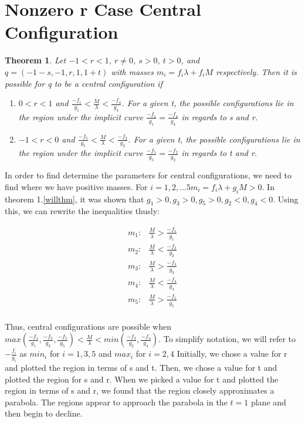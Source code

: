 \documentclass[11pt,leqno]{article}
\newtheorem{theorem}{Theorem}[section]
\theoremstyle{definition}
\theoremstyle{remark}
\numberwithin{equation}{section}
\begin{document}
\section{Nonzero r Case Central Configuration}

\begin{theorem}
\label{thmsc}
\emph{Let $-1<r<1$, $r\neq0$, $s>0$, $t>0$, and $q=(-1-s,-1,r,1,1+t)$
with masses $m_{i}=f_{i}\lambda+f_{i}M$ respectively. Then it is possible for q to be a
central configuration if }
\begin{enumerate}
\item \emph{$0<r<1$ and $\frac{-f_{1}}{g_{1}}<\frac{M}{\lambda}<\frac{-f_{4}}{g_{4}}$.
For a given t, the possible configurations lie in the region under
the implicit curve $\frac{-f_{1}}{g_{1}}=\frac{-f_{4}}{g_{4}}$ in
regards to s and r.}
\item \emph{$-1<r<0$ and $\frac{-f_{5}}{g_{5}}<\frac{M}{\lambda}<\frac{-f_{2}}{g_{2}}$.
For a given t, the possible configurations lie in the region under
the implicit curve $\frac{-f_{5}}{g_{5}}=\frac{-f_{2}}{g_{2}}$ in
regards to t and r.}\end{enumerate}
\end{theorem}

In order to find determine the parameters for central configurations, we need to find where we have positive masses. For $i={1,2,...5} m_i = f_i\lambda + g_iM > 0$. In theorem 1.\ref{willthm}, it was shown that $g_1 > 0, g_3 > 0, g_5 > 0, g_2 < 0, g_4 < 0$. Using this, we can rewrite the inequalities thusly: 

\begin{equation} \begin{array}{ll}
m_1: & \frac{M}{\lambda} > \frac{-f_1}{g_1} \\
m_2: & \frac{M}{\lambda} < \frac{-f_2}{g_2} \\
m_3: & \frac{M}{\lambda} > \frac{-f_3}{g_3} \\
m_4: & \frac{M}{\lambda} < \frac{-f_4}{g_4} \\
m_5: & \frac{M}{\lambda} > \frac{-f_5}{g_5} \\
\end{array}
\end{equation}

Thus, central configurations are possible when $max(\frac{-f_1}{g_1},\frac{-f_3}{g_3},\frac{-f_5}{g_5})<\frac{M}{\lambda}<min(\frac{-f_2}{g_2},\frac{-f_4}{g_4})$. To simplify notation, we will refer to $-\frac{f_i}{g_i}$ as $min_i$ for $i={1,3,5}$ and $max_i$ for $i={2,4}$ Initially, we chose a value for r and plotted the region in terms of s and t. Then, we chose a value for t and plotted the region for s and r. When we picked a value for t and plotted the region in terms of s and r, we found that the region closely approximates a parabola. The regions appear to approach the parabola in the $t=1$ plane and then begin to decline.
\end{document}

